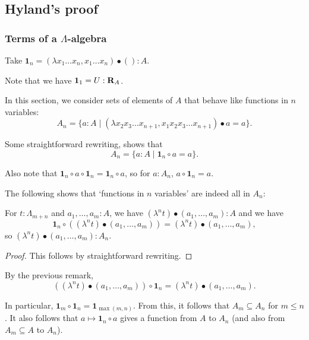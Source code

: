 \subsection{Hyland's proof}

\subsubsection{Terms of a \texorpdfstring{$ \Lambda $}{Lambda}-algebra}

\begin{definition}
  Take $ \mathbf 1_n = (\lambda x_1 \dots x_n, x_1 \dots x_n) \bullet () : A $.
\end{definition}

\begin{remark}
  Note that we have $ \mathbf 1_1 = U : \mathbf{R}_A $.
\end{remark}

\begin{definition}
  In this section, we consider sets of elements of $ A $ that behave like functions in $ n $ variables:
  \[ A_n = \{ a : A \mid (\lambda x_2 x_3 \dots x_{n + 1}, x_1 x_2 x_3 \dots x_{n + 1}) \bullet a = a \}. \]
\end{definition}

\begin{remark}
  Some straightforward rewriting, shows that
  \[ A_n = \{ a : A \mid \mathbf 1_n \circ a = a \}. \]
\end{remark}

\begin{remark}
  Also note that $ \mathbf 1_n \circ a \circ \mathbf 1_n = \mathbf 1_n \circ a $, so for $ a : A_n $, $ a \circ \mathbf 1_n = a $.
\end{remark}

The following shows that `functions in $ n $ variables' are indeed all in $ A_n $:
\begin{lemma}
  For $ t: \Lambda_{m + n} $ and $ a_1, \dots, a_m: A $, we have $ (\lambda^n t) \bullet (a_1, \dots, a_m) : A $ and we have
  \[ \mathbf 1_n \circ ((\lambda^n t) \bullet (a_1, \dots, a_m)) = (\lambda^n t) \bullet (a_1, \dots, a_m), \]
  so $ (\lambda^n t) \bullet (a_1, \dots, a_m) : A_n $.
\end{lemma}
\begin{proof}
  This follows by straightforward rewriting.
\end{proof}

\begin{corollary}
  By the previous remark,
  \[ ((\lambda^n t) \bullet (a_1, \dots, a_m)) \circ \mathbf 1_n = (\lambda^n t) \bullet (a_1, \dots, a_m). \]
\end{corollary}
\begin{corollary}
  In particular, $ \mathbf 1_m \circ \mathbf 1_n = \mathbf 1_{\max(m, n)} $. From this, it follows that $ A_m \subseteq A_n $ for $ m \leq n $. It also follows that $ a \mapsto \mathbf 1_n \circ a $ gives a function from $ A $ to $ A_n $ (and also from $ A_m \subseteq A $ to $ A_n $).
\end{corollary}


